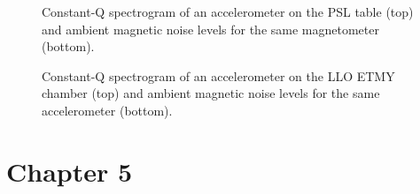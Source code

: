 \documentclass[11pt]{article}
\begin{document}
\begin{figure}
	\centering
	\caption{Constant-Q spectrogram of an accelerometer on the PSL table (top) and ambient magnetic noise levels for the same magnetometer (bottom).}
	\label{fig:vetting_gw170817_lho}
\end{figure}

\begin{figure}
	\centering
	\caption{Constant-Q spectrogram of an accelerometer on the LLO ETMY chamber (top) and ambient magnetic noise levels for the same accelerometer (bottom).}
	\label{fig:vetting_gw170817_llo}
\end{figure}

\section{Chapter 5}
\end{document}
